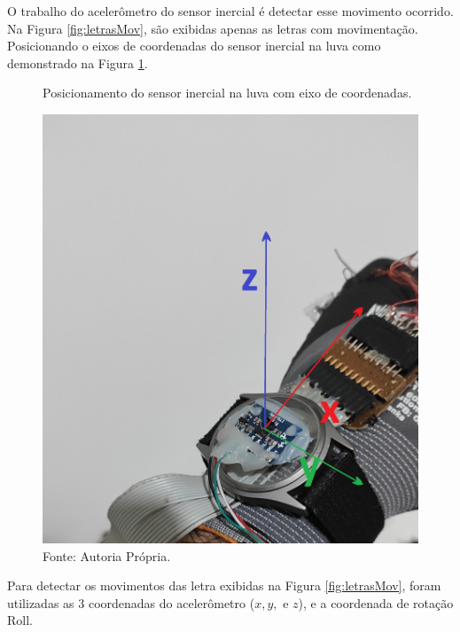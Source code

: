  O trabalho do acelerômetro do sensor inercial é detectar esse movimento ocorrido. Na Figura \ref{fig:letrasMov}, são exibidas apenas as letras com movimentação. Posicionando o eixos de coordenadas do sensor inercial na luva como demonstrado na Figura \ref{fig:LuvaMPU}.

\begin{figure}[H]
	\vspace{4mm}
	\centering
	\caption{Posicionamento do sensor inercial na luva com eixo de coordenadas.}
	\label{fig:LuvaMPU}
	\includegraphics[scale=0.1]{imagens/luvaComMput}
	\caption*{Fonte: Autoria Própria.}
\end{figure}

Para detectar os movimentos das letra exibidas na Figura \ref{fig:letrasMov}, foram utilizadas as 3 coordenadas do acelerômetro ($x, y,$ e $z$), e a coordenada de rotação Roll.

